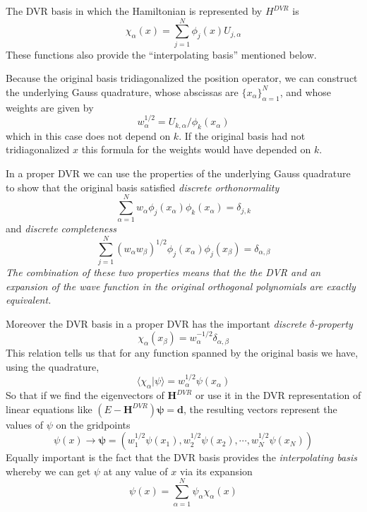 \documentclass[aps,amssymb,superscriptaddress,floatfix]{revtex4}
\begin{document}
The DVR basis in which the Hamiltonian is represented by $H^{DVR}$ is
\begin{equation}
\chi_\alpha(x) = \sum_{j=1}^N \phi_j(x)U_{j,\alpha}
\end{equation}
These functions also provide the ``interpolating basis'' mentioned below.

Because the original basis tridiagonalized the position operator, we can construct the underlying Gauss quadrature, whose abscissas are $\{x_\alpha\}_{\alpha=1}^N$, and whose weights are given by
\begin{equation}
w_\alpha^{1/2}=U_{k,\alpha} / \phi_k(x_\alpha)
\end{equation}
which  in this case does not depend on $k$.  If the original basis had not tridiagonalized $x$ this formula for the weights would have depended on $k$.  

In a proper DVR we can use the properties of the underlying Gauss quadrature to show that the original basis satisfied \textit{discrete orthonormality}
\begin{equation}
\sum_{\alpha = 1}^N w_\alpha \phi_j (x_\alpha) \phi_k(x_\alpha) = \delta_{j,k}
\end{equation}
and \textit{discrete completeness}
\begin{equation}
\sum_{j = 1}^N (w_\alpha w_\beta)^{1/2} \phi_j (x_\alpha) \phi_j(x_\beta) = \delta_{\alpha,\beta}
\end{equation}
\textit{The combination of these two properties means that the the DVR and an expansion of the wave function in the original orthogonal polynomials are exactly equivalent.}

Moreover the DVR basis in a proper DVR has the important \textit{discrete $\delta$-property}
\begin{equation}
\chi_\alpha(x_\beta) = w_\alpha^{-1/2}\delta_{\alpha,\beta}
\end{equation}
This relation tells us that for any function spanned by the original basis we have, using the quadrature,
\begin{equation}
\langle \chi_\alpha|\psi \rangle = w_\alpha^{1/2} \psi(x_\alpha)
\end{equation}
So that if we find the eigenvectors of  $\mathbf{H}^{DVR}$ or use it in the DVR representation of linear equations like $(E-\mathbf{H}^{DVR})\boldsymbol{\psi} = \mathbf{d}$,  the resulting vectors represent the values of $\psi$ on the gridpoints
\begin{equation}
\psi(x) \rightarrow \boldsymbol{\psi}=(w_1^{1/2}\psi(x_1),w_2^{1/2}\psi(x_2),\cdots,w_N^{1/2}\psi(x_N))
\end{equation}
Equally important is the fact that the DVR basis provides the \textit{interpolating basis} whereby we can get $\psi$ at any value of $x$ via its expansion
\begin{equation}
\psi(x) = \sum_{\alpha=1}^N \psi_\alpha \chi_\alpha(x)
\end{equation}
\end{document}
